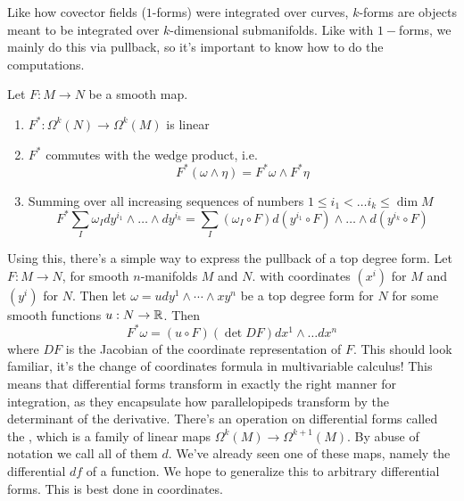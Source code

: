 %
Like how covector fields ($1$-forms) were integrated over curves, $k$-forms
are objects meant to be integrated over $k$-dimensional submanifolds. Like
with $1-$forms, we mainly do this via pullback, so it's important to know
how to do the computations.
%
\begin{prop}
  Let $ F: M \to N$ be a smooth map.
  \begin{enumerate}
    \item $F^* : \Omega^k(N) \to \Omega^k(M)$ is linear
    \item $F^*$ commutes with the wedge product, i.e.
    $$F^*(\omega \wedge \eta) = F^*\omega \wedge F^*\eta $$
    \item Summing over all increasing sequences of numbers $1 \leq i_1 < \ldots i_k \leq \dim M$
    $$F^* \sum_I \omega_I dy^{i_1} \wedge \ldots \wedge dy^{i_k} =
    \sum_I (\omega_I \circ F) d(y^{i_1} \circ F) \wedge \ldots \wedge d(y^{i_k}\circ F)$$
  \end{enumerate}
\end{prop}
%
Using this, there's a simple way to express the pullback of a top degree form.
Let $F: M \to N$, for smooth $n$-manifolds $M$ and $N$.
with coordinates $(x^i)$ for $M$ and $(y^i)$ for $N$. Then
let $\omega = u dy^1 \wedge \cdots \wedge xy^n$ be a top degree form for $N$
for some smooth functions $u : N \to \mathbb{R}$. Then
$$F^*\omega = (u \circ F)(\det DF)dx^1 \wedge \ldots  dx^n$$
where $DF$ is the Jacobian of the coordinate representation of $F$.
This should look familiar, it's the change of coordinates formula in
multivariable calculus! This means that differential forms transform in
exactly the right manner for integration, as they encapsulate how parallelopipeds
transform by the determinant of the derivative.
%
%
There's an operation on differential forms called the ,
which is a family of linear maps $\Omega^k(M) \to \Omega^{k+1}(M)$. By abuse of
notation we call all of them $d$. We've already seen one of these maps, namely
the differential $df$ of a function. We hope to generalize this to arbitrary
differential forms. This is best done in coordinates. \\

